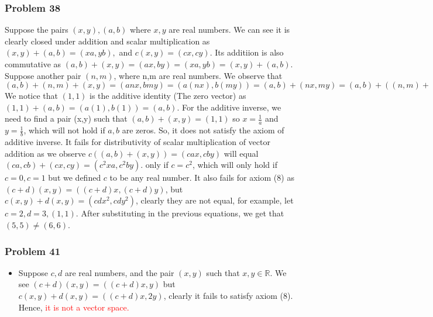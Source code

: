 \documentclass[a4paper,12pt]{article}
\begin{document}
\subsubsection*{Problem 38}
Suppose the pairs $(x,y),(a,b)$ where $x,y$ are real numbers. We can see it is clearly closed under addition and scalar multiplication as $(x,y)+(a,b)=(xa,yb),$ and $c(x,y)=(cx,cy).$ Its additiion is also commutative as $(a,b)+(x,y)=(ax,by)=(xa,yb)=(x,y)+(a,b).$ Suppose another pair $(n,m)$, where n,m are real numbers. We observe that $(a,b)+(n,m)+(x,y) = (anx,bmy)=(a(nx),b(my))=(a,b)+(nx,my)=(a,b)+((n,m)+(x,y))=((an)x,(bm)y)=(an,bm)+(x,y)=((a,b)+(n,m))+(x,y).$ We notice that $(1,1)$ is the additive identity (The zero vector) as $(1,1)+(a,b)=(a(1),b(1))=(a,b).$ For the additive inverse, we need to find a pair (x,y) such that $(a,b)+(x,y)=(1,1)$ so $x=\frac{1}{a}$ and $y=\frac{1}{b}$,  which will not hold if $a,b$ are zeros. So, it does not satisfy the axiom of additive inverse.
It fails for distributivity of scalar multiplication of vector addition as we observe $c((a,b)+(x,y))=(cax,cby)$ will equal $(ca,cb)+(cx,cy)=(c^2xa,c^2by).$ only if $c=c^2$, which will only hold if $c=0, c=1$ but we defined $c$ to be any real number. It also fails for axiom (8) as $(c+d)(x,y)=((c+d)x,(c+d)y)$, but $c(x,y)+d(x,y)=(cdx^2,cdy^2)$, clearly they are not equal, for example, let $c=2,d=3, (1,1)$. After substituting in the previous equations, we get that $(5,5)\neq (6,6)$.
\subsubsection*{Problem 41}
\begin{itemize}
    \item [a)] Suppose $c,d$ are real numbers, and the pair $(x,y)$ such that $x,y \in \mathbb{R}$. We see $(c+d)(x,y)=((c+d)x,y)$ but $c(x,y)+d(x,y)=((c+d)x,2y)$, clearly it fails to satisfy axiom (8). Hence, \textcolor{red}{it is not a vector space.}
\end{itemize}
\end{document}
